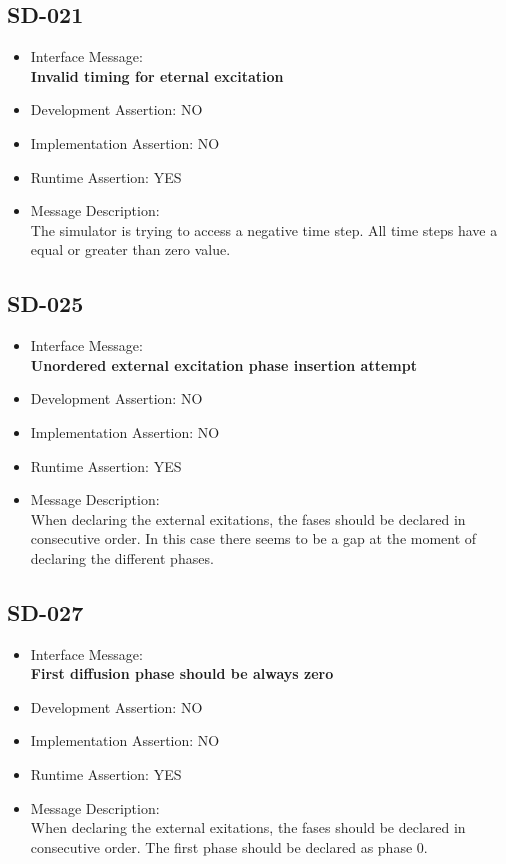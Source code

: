 \subsection{SD-021}
\begin{itemize}
  \item Interface Message:\\[1em]
    \textbf{Invalid timing for eternal excitation}
  \item Development Assertion: NO
  \item Implementation Assertion: NO
  \item Runtime Assertion: YES
  \item Message Description:\\[1em]
    The simulator is trying to access a negative time step. All time steps have a equal or greater than zero value.
\end{itemize}

\subsection{SD-025}
\begin{itemize}
  \item Interface Message:\\[1em]
    \textbf{Unordered external excitation phase insertion attempt}
  \item Development Assertion: NO
  \item Implementation Assertion: NO
  \item Runtime Assertion: YES
  \item Message Description:\\[1em]
    When declaring the external exitations, the fases should be declared in consecutive order. In this case there seems to be a gap at the moment of declaring the different phases.
\end{itemize}

\subsection{SD-027}
\begin{itemize}
  \item Interface Message:\\[1em]
    \textbf{First diffusion phase should be always zero}
  \item Development Assertion: NO
  \item Implementation Assertion: NO
  \item Runtime Assertion: YES
  \item Message Description:\\[1em]
    When declaring the external exitations, the fases should be declared in consecutive order. The first phase should be declared as phase 0.
\end{itemize}

